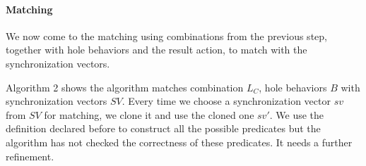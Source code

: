 \documentclass{lncs/llncs}
\newcommand{\QIN}[1]{\textcolor{airforceblue}{#1}}
\begin{document}
\paragraph{Matching}
\QIN{
We now come to the matching using combinations from the previous step, together with hole behaviors and the result action, to match with the synchronization vectors. 
}

\QIN{
Algorithm 2 shows the algorithm matches combination $L_C$, hole behaviors $B$ with synchronization vectors $SV$. Every time we choose a synchronization vector $sv$ from $SV$ for matching, we clone it and use the cloned one $sv'$. We use the definition declared before to construct all the possible predicates but the algorithm has not checked the correctness of these predicates. It needs a further refinement.
}
\end{document}
